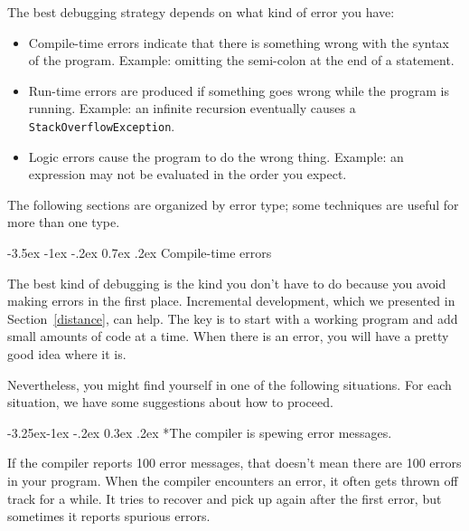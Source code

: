\documentclass[12pt]{book}
\makeatletter
\theoremstyle{exercise}
\renewcommand{\section}{\@startsection{section}{1}{\z@}%
    {-3.5ex \@plus -1ex \@minus -.2ex}%
    {0.7ex \@plus.2ex}%
    {\normalfont\Large\bfseries}}
\renewcommand\subsection{\@startsection{subsection}{2}{\z@}%
    {-3.25ex\@plus -1ex \@minus -.2ex}%
    {0.3ex \@plus .2ex}%
    {\normalfont\large\bfseries}}
\makeatother
\begin{document}
The best debugging strategy depends on what kind of error you have:

\begin{itemize}

\item Compile-time errors indicate that there is something wrong with the syntax of the program.  Example: omitting the semi-colon at the end of a statement.

\item Run-time errors are produced if something goes wrong while the program is running.  Example: an infinite recursion eventually causes a {\tt StackOverflowException}.

\item Logic errors cause the program to do the wrong thing.  Example: an expression may not be evaluated in the order you expect.

\end{itemize}


The following sections are organized by error type; some techniques are useful for more than one type.


\section{Compile-time errors}

The best kind of debugging is the kind you don't have to do because you avoid making errors in the first place.
Incremental development, which we presented in Section~\ref{distance}, can help.
The key is to start with a working program and add small amounts of code at a time.
When there is an error, you will have a pretty good idea where it is.

Nevertheless, you might find yourself in one of the following situations.
For each situation, we have some suggestions about how to proceed.


\subsection*{The compiler is spewing error messages.}

If the compiler reports 100 error messages, that doesn't mean there are 100 errors in your program.
When the compiler encounters an error, it often gets thrown off track for a while.
It tries to recover and pick up again after the first error, but sometimes
it reports spurious errors.
\end{document}
